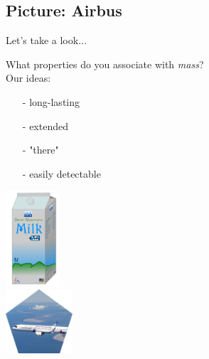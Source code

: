    \subsection{Picture: Airbus}
\begin{frame}{Let's take a look...}
\begin{minipage}{0.1\textwidth}
    \quad
\end{minipage}
            \begin{minipage}[t]{0.49\textwidth}
      \vspace{1cm} 
      What properties do you associate with \emph{mass}? \pause \\ Our ideas:
      
      \begin{center}
        \begin{itemize}
             \item[-] long-lasting
            \item [-] extended
            \item [-]"there"
            \item [-] easily detectable
        \end{itemize}
         \end{center}
      \end{minipage}
      \begin{minipage}[t]{0.29\textwidth}
     \centering
     \vspace{+.1cm}
         \includegraphics[width=2cm]{Figures Lecture on Hadrons/SevenMountainsMilk.png}\\ \vspace{.5cm}
         \includegraphics[width=2.5cm]{Figures Lecture on Hadrons/Airbus A321Neo.jpg}
           \end{minipage} 
 \end{frame}

